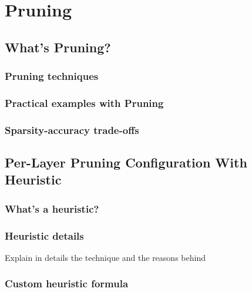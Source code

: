 \chapter{Pruning}\label{ch:pruning}
\lipsum[1]

\section{What's Pruning?}
\lipsum[1]

\subsection{Pruning techniques}
\lipsum[1]

\subsection{Practical examples with Pruning}
\lipsum[1]

\subsection{Sparsity-accuracy trade-offs}
\lipsum[1]

\section{Per-Layer Pruning Configuration With Heuristic}\label{sec:heuristic}
\lipsum[1]

\subsection{What's a heuristic?}
\lipsum[1]

\subsection{Heuristic details}
Explain in details the technique and the reasons behind
\lipsum[1]

\subsection{Custom heuristic formula}
\lipsum[1]
